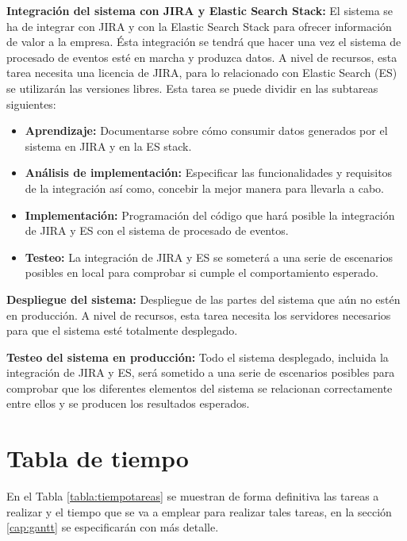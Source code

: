 \textbf{Integración del sistema con JIRA y Elastic Search Stack:} El sistema se ha de integrar con JIRA y con la Elastic Search Stack para ofrecer información de valor a la empresa. Ésta integración se tendrá que hacer una vez el sistema de procesado de eventos esté en marcha y produzca datos. A nivel de recursos, esta tarea necesita una licencia de JIRA, para lo relacionado con Elastic Search (ES) se utilizarán las versiones libres. Esta tarea se puede dividir en las subtareas siguientes:
\begin{itemize}
	
	\item \textbf{Aprendizaje:} Documentarse sobre cómo consumir datos generados por el sistema en JIRA y en la ES stack.
	
	\item \textbf{Análisis de implementación:} Especificar las funcionalidades y requisitos de la integración así como, concebir la mejor manera para llevarla a cabo.
	
	\item \textbf{Implementación:} Programación del código que hará posible la integración de JIRA y ES con el sistema de procesado de eventos.
	
	\item \textbf{Testeo:} La integración de JIRA y ES se someterá a una serie de escenarios posibles en local para comprobar si cumple el comportamiento esperado.
	
\end{itemize}

\textbf{Despliegue del sistema:} Despliegue de las partes del sistema que aún no estén en producción. A nivel de recursos, esta tarea necesita los servidores necesarios para que el sistema esté totalmente desplegado.

\textbf{Testeo del sistema en producción:} Todo el sistema desplegado, incluida la integración de JIRA y ES, será sometido a una serie de escenarios posibles para comprobar que los diferentes elementos del sistema se relacionan correctamente entre ellos y se producen los resultados esperados.

\section{Tabla de tiempo}
En el Tabla \ref{tabla:tiempotareas} se muestran de forma definitiva las tareas a realizar y el tiempo que se va a emplear para realizar tales tareas, en la sección \ref{cap:gantt} se especificarán con más detalle.

